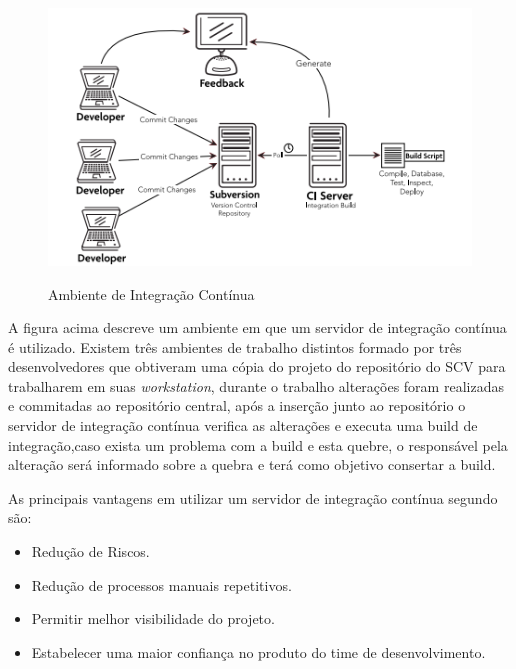 \begin{figure}[tbh]
\centering
\caption[Ambiente de Integração Contínua]{Ambiente de Integração Contínua}
\includegraphics[width=0.7\linewidth]{./images/CI}
\label{fig:CI}
\end{figure}

A figura acima descreve um ambiente em que um servidor de integração contínua é utilizado. Existem três ambientes de trabalho distintos formado por três desenvolvedores que obtiveram uma cópia do projeto do repositório do SCV para trabalharem em suas \textit{workstation}, durante o trabalho alterações foram realizadas e commitadas ao repositório central, após a inserção junto ao repositório o servidor de integração contínua verifica as alterações e executa uma build de integração,caso exista um problema com a build e esta quebre, o responsável pela alteração será informado sobre a quebra e terá como objetivo consertar a build.

As principais vantagens em utilizar um servidor de integração contínua segundo  são:

\begin{itemize}
\item Redução de Riscos.
\item Redução de processos manuais repetitivos.
\item Permitir melhor visibilidade do projeto.
\item Estabelecer uma maior confiança no produto do time de desenvolvimento.
\end{itemize}

